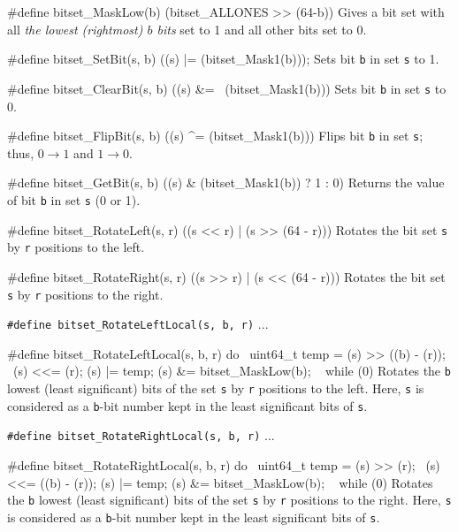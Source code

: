 #define bitset_MaskLow(b) (bitset_ALLONES >> (64-b))
\endcode
 \tab Gives a bit set with all \emph{the lowest (rightmost) $b$ bits} set to 1 
  and all other bits set to 0.  
 \endtab
\code

#define bitset_SetBit(s, b) ((s) |= (bitset_Mask1(b)));
\endcode
 \tab  Sets bit {\tt b} in set  {\tt s}  to 1.
 \endtab
\code

#define bitset_ClearBit(s, b) ((s) &= ~(bitset_Mask1(b)))
\endcode
 \tab  Sets bit {\tt b} in set  {\tt s}  to 0.
 \endtab
\code

#define bitset_FlipBit(s, b) ((s) ^= (bitset_Mask1(b)))
\endcode
 \tab  Flips bit {\tt b} in set {\tt s};  thus,
        $0 \rightarrow 1$ and $1 \rightarrow 0$.
 \endtab
\code

#define bitset_GetBit(s, b)  ((s) & (bitset_Mask1(b)) ? 1 : 0)
\endcode
 \tab  Returns the value of bit {\tt b} in set {\tt s} (0 or 1).
 \endtab
\code

#define bitset_RotateLeft(s, r)  ((s << r) | (s >> (64 - r)))
\endcode
 \tab  Rotates the bit set {\tt s} by {\tt r} positions to the left.
 \endtab
\code

#define bitset_RotateRight(s, r)  ((s >> r) | (s << (64 - r)))
\endcode
 \tab  Rotates the bit set {\tt s} by {\tt r} positions to the right.
\endtab

\noindent
{\tt\#define bitset\_RotateLeftLocal(s, b, r)}  ...

\hide\code
#define bitset_RotateLeftLocal(s, b, r) do { \
   uint64_t temp = (s) >> ((b) - (r)); \
   (s) <<= (r);   (s) |= temp;   (s) &= bitset_MaskLow(b); \
   } while (0)
\endcode\endhide
\tab  Rotates the {\tt b} lowest (least significant) bits of 
  the set {\tt s} by {\tt r} positions to the left.
  Here, {\tt s} is considered as a {\tt b}-bit number kept
  in the least significant bits of {\tt s}.
 \endtab

\noindent
{\tt\#define bitset\_RotateRightLocal(s, b, r)}  ... 

\hide\code
#define bitset_RotateRightLocal(s, b, r) do { \
   uint64_t temp = (s) >> (r); \
   (s) <<= ((b) - (r));   (s) |= temp;   (s) &= bitset_MaskLow(b); \
   } while (0)
\endcode\endhide
 \tab  Rotates the {\tt b} lowest (least significant) bits of 
  the set {\tt s} by {\tt r} positions to the right.
  Here, {\tt s} is considered as a {\tt b}-bit number kept
  in the least significant bits of {\tt s}.
 \endtab


\guisec{Prototypes}
\code

